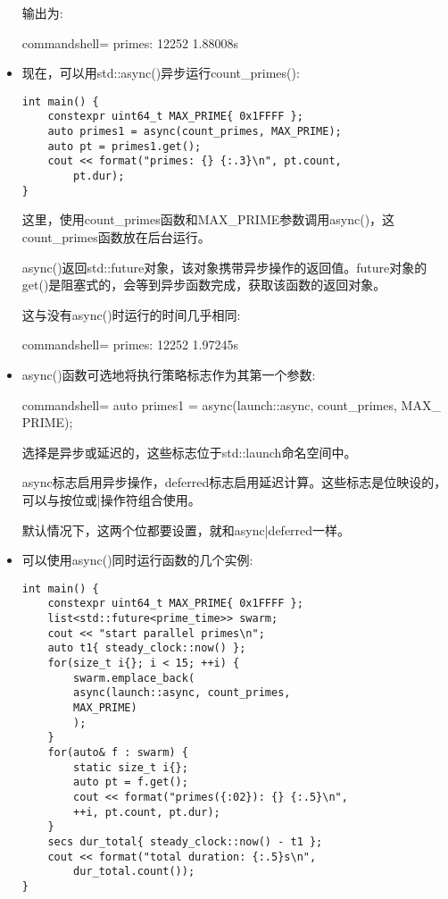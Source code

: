 \begin{itemize}
输出为:

\begin{tcblisting}{commandshell={}}
primes: 12252 1.88008s
\end{tcblisting}

\item 
现在，可以用std::async()异步运行count\_primes():

\begin{lstlisting}[style=styleCXX]
int main() {
	constexpr uint64_t MAX_PRIME{ 0x1FFFF };
	auto primes1 = async(count_primes, MAX_PRIME);
	auto pt = primes1.get();
	cout << format("primes: {} {:.3}\n", pt.count,
		pt.dur);
}
\end{lstlisting}

这里，使用count\_primes函数和MAX\_PRIME参数调用async()，这count\_primes函数放在后台运行。

async()返回std::future对象，该对象携带异步操作的返回值。future对象的get()是阻塞式的，会等到异步函数完成，获取该函数的返回对象。

这与没有async()时运行的时间几乎相同:

\begin{tcblisting}{commandshell={}}
primes: 12252 1.97245s
\end{tcblisting}

\item 
async()函数可选地将执行策略标志作为其第一个参数:

\begin{tcblisting}{commandshell={}}
auto primes1 = async(launch::async, count_primes, MAX_
PRIME);
\end{tcblisting}

选择是异步或延迟的，这些标志位于std::launch命名空间中。

async标志启用异步操作，deferred标志启用延迟计算。这些标志是位映设的，可以与按位或|操作符组合使用。

默认情况下，这两个位都要设置，就和async|deferred一样。

\item 
可以使用async()同时运行函数的几个实例:

\begin{lstlisting}[style=styleCXX]
int main() {
	constexpr uint64_t MAX_PRIME{ 0x1FFFF };
	list<std::future<prime_time>> swarm;
	cout << "start parallel primes\n";
	auto t1{ steady_clock::now() };
	for(size_t i{}; i < 15; ++i) {
		swarm.emplace_back(
		async(launch::async, count_primes,
		MAX_PRIME)
		);
	}
	for(auto& f : swarm) {
		static size_t i{};
		auto pt = f.get();
		cout << format("primes({:02}): {} {:.5}\n",
		++i, pt.count, pt.dur);
	}
	secs dur_total{ steady_clock::now() - t1 };
	cout << format("total duration: {:.5}s\n",
		dur_total.count());
}
\end{lstlisting}


\end{itemize}
